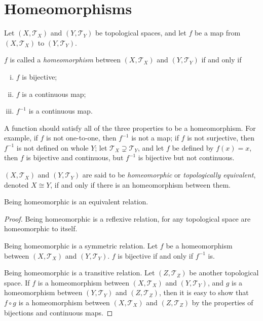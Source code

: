 \section{Homeomorphisms}


Let $(X, \mathcal T_X)$ and $(Y, \mathcal T_Y)$ be topological spaces, and let $f$ be a map from $(X, \mathcal T_X)$ to $(Y, \mathcal T_Y)$.


\begin{definition}
	$f$ is called a \textit{homeomorphism} between $(X, \mathcal T_X)$ and $(Y, \mathcal T_Y)$ if and only if
	\begin{enumerate}[(i)]
		\item $f$ is bijective;
		\item $f$ is a continuous map;
		\item $f^{-1}$ is a continuous map.
	\end{enumerate}
\end{definition}


\begin{note}
	A function should satisfy all of the three properties to be a homeomorphism. For example, if $f$ is not one-to-one, then $f^{-1}$ is not a map; if $f$ is not surjective, then $f^{-1}$ is not defined on whole $Y$; let $\mathcal T_X \supsetneq \mathcal T_Y$, and let $f$ be defined by $f(x) = x$, then $f$ is bijective and continuous, but $f^{-1}$ is bijective but not continuous.
\end{note}


\begin{definition}
	$(X, \mathcal T_X)$ and $(Y, \mathcal T_Y)$ are said to be \textit{homeomorphic} or \textit{topologically equivalent}, denoted $X \cong Y$, if and only if there is an homeomorphism between them.
\end{definition}


\begin{proposition}
	Being homeomorphic is an equivalent relation.
	
	\begin{proof}
		Being homeomorphic is a reflexive relation, for any topological space are homeomorphic to itself.
		
		Being homeomorphic is a symmetric relation. Let $f$ be a homeomorphism between $(X, \mathcal T_X)$ and $(Y, \mathcal T_Y)$. $f$ is bijective if and only if $f^{-1}$ is.
		
		Being homeomorphic is a transitive relation. Let $(Z, \mathcal T_Z)$ be another topological space. If $f$ is a homeomorphism between $(X, \mathcal T_X)$ and $(Y, \mathcal T_Y)$, and $g$ is a homeomorphism between $(Y, \mathcal T_Y)$ and $(Z, \mathcal T_Z)$, then it is easy to show that $f\circ g$ is a homeomorphism between $(X, \mathcal T_X)$ and $(Z, \mathcal T_Z)$ by the properties of bijections and continuous maps.
	\end{proof}
\end{proposition}


